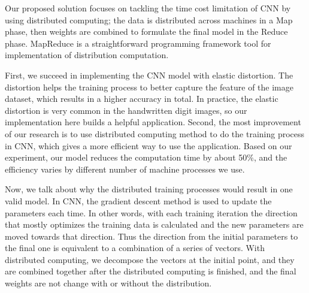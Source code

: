 Our proposed solution focuses on tackling the time cost limitation of CNN by using distributed computing; the data is distributed across machines in a Map phase, then weights are combined to formulate the final model in the Reduce phase. MapReduce is a straightforward programming framework tool for implementation of distribution computation. 

First, we succeed in implementing the CNN model with elastic distortion. The distortion helps the training process to better capture the feature of the image dataset, which results in a higher accuracy in total. In practice, the elastic distortion is very common in the handwritten digit images, so our implementation here builds a helpful application.
Second, the most improvement of our research is to use distributed computing method to do the training process in CNN, which gives a more efficient way to use the application. Based on our experiment, our model reduces the computation time by about 50\%, and the efficiency varies by different number of machine processes we use.

Now, we talk about why the distributed training processes would result in one valid model. In CNN, the gradient descent method is used to update the parameters each time. In other words, with each training iteration the direction that mostly optimizes the training data is calculated and the new parameters are moved towards that direction. 
Thus the direction from the initial parameters to the final one is equivalent to a combination of a series of vectors. With distributed computing, we decompose the vectors at the initial point, and they are combined together after the distributed computing is finished, and the final weights are not change with or without the distribution. 

